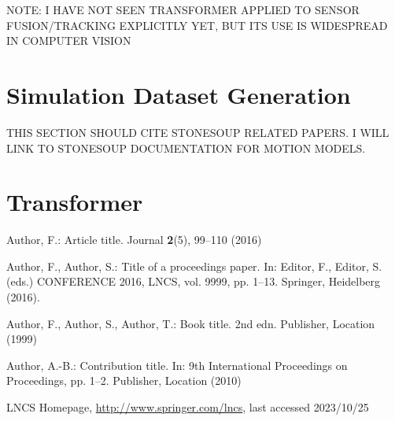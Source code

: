 \documentclass[runningheads]{llncs}
\begin{document}
NOTE: I HAVE NOT SEEN TRANSFORMER APPLIED TO SENSOR FUSION/TRACKING EXPLICITLY YET, BUT ITS USE IS WIDESPREAD IN COMPUTER VISION

\section{Simulation Dataset Generation}

THIS SECTION SHOULD CITE STONESOUP RELATED PAPERS. I WILL LINK TO STONESOUP DOCUMENTATION FOR MOTION MODELS.

\section{Transformer}




%
%
%
% 
% 
%
\begin{thebibliography}{8}
Author, F.: Article title. Journal \textbf{2}(5), 99--110 (2016)

Author, F., Author, S.: Title of a proceedings paper. In: Editor,
F., Editor, S. (eds.) CONFERENCE 2016, LNCS, vol. 9999, pp. 1--13.
Springer, Heidelberg (2016). 

Author, F., Author, S., Author, T.: Book title. 2nd edn. Publisher,
Location (1999)

Author, A.-B.: Contribution title. In: 9th International Proceedings
on Proceedings, pp. 1--2. Publisher, Location (2010)

LNCS Homepage, \url{http://www.springer.com/lncs}, last accessed 2023/10/25
\end{thebibliography}
\end{document}

